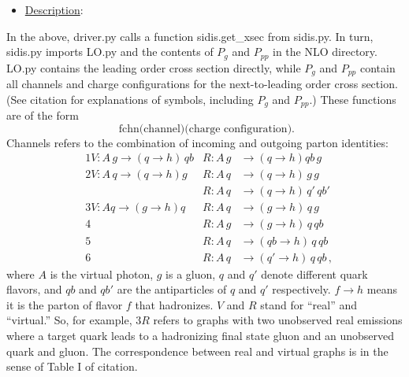 \documentclass[12pt]{article}
\newcommand\3[1]{\boldsymbol{#1}}
\begin{document}
\begin{itemize}
\item \underline{Description}:
\end{itemize}

In the above, driver.py calls a function sidis.get\_xsec from sidis.py. In turn, sidis.py imports 
LO.py and the contents of $P_g$ and $P_{pp}$ in the NLO directory.  LO.py contains the leading order 
cross section directly, while $P_g$ and $P_{pp}$ contain all channels and charge configurations for the next-to-leading order 
 cross section. (See {\color{red} citation} for explanations of symbols, including $P_g$ and $P_{pp}$.) These functions are of the form 
 $$
 {\text{ fchn(channel)(charge configuration)}} .
 $$
Channels refers to the combination of incoming and outgoing parton identities:
\begin{align}
 &{}1 V: A \,  g  \to(q\to h) \, qb  &{} R: A \, g  &{}  \to(q\to h)  qb\, g  \\
 &{}2 V: A \,  q \to(q\to h) g   &{}R: A \, q  &{}\to(q\to h) \, g  \, g   \\
 &{}                                    &{} R: A \, q  &{} \to(q \to h) \, q' \, qb' \\
 &{} 3 V: A q  \to(g\to h) q   &{} R: A \, q  &{} \to(g \to h) \, q \, g   \\
 &{}4                                      &{} R: A \,  g  &{}\to(g \to h) \, q \, qb  \\
 &{}5                                      &{}R: A \, q  &{}\to(qb\to h)\, q \, qb  \\
 &{}6                                     &{} R: A \, q  &{}\to(q' \to h)\, q \, qb  \, ,
\end{align}
where $A$ is the virtual photon, $g$ is a gluon, $q$ and $q'$ denote different quark flavors, and $qb$ and $qb'$ are the antiparticles of $q$ and $q'$ respectively. 
$f \to h$ means it is the parton of flavor $f$ that hadronizes. $V$ and $R$ stand for ``real'' and ``virtual.'' So, for example, $3 R$ refers to graphs with two unobserved 
real emissions where a target quark leads to a hadronizing final state gluon and an unobserved quark and gluon. The correspondence between 
real and virtual graphs is in the sense of Table I of {\color{red} citation}.
\end{document}
